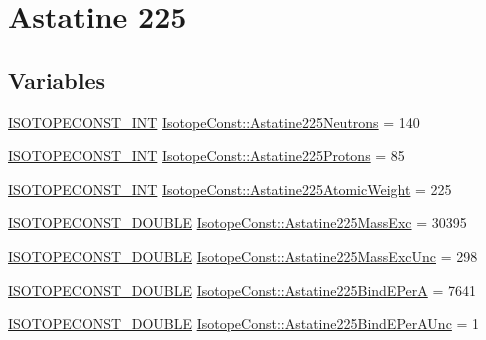 \hypertarget{group___isotope_const-_astatine-_at225}{}\section{Astatine 225}
\label{group___isotope_const-_astatine-_at225}
\subsection*{Variables}
\begin{DoxyCompactItemize}
\item 
\mbox{\hyperlink{group___isotope_const-_macros_ga5f18360b3e99483a35c32d789e62621c}{I\+S\+O\+T\+O\+P\+E\+C\+O\+N\+S\+T\+\_\+\+I\+NT}} \mbox{\hyperlink{group___isotope_const-_astatine-_at225_ga0b307c49f7bea060ae8488622fe5dac0}{Isotope\+Const\+::\+Astatine225\+Neutrons}} = 140
\item 
\mbox{\hyperlink{group___isotope_const-_macros_ga5f18360b3e99483a35c32d789e62621c}{I\+S\+O\+T\+O\+P\+E\+C\+O\+N\+S\+T\+\_\+\+I\+NT}} \mbox{\hyperlink{group___isotope_const-_astatine-_at225_ga6018cf1808e6bab5e8fb52839db77f6d}{Isotope\+Const\+::\+Astatine225\+Protons}} = 85
\item 
\mbox{\hyperlink{group___isotope_const-_macros_ga5f18360b3e99483a35c32d789e62621c}{I\+S\+O\+T\+O\+P\+E\+C\+O\+N\+S\+T\+\_\+\+I\+NT}} \mbox{\hyperlink{group___isotope_const-_astatine-_at225_ga97534ac858da112b8a551ad422049b04}{Isotope\+Const\+::\+Astatine225\+Atomic\+Weight}} = 225
\item 
\mbox{\hyperlink{group___isotope_const-_macros_ga8f45a7272ce02c0b4c65c44636ed719a}{I\+S\+O\+T\+O\+P\+E\+C\+O\+N\+S\+T\+\_\+\+D\+O\+U\+B\+LE}} \mbox{\hyperlink{group___isotope_const-_astatine-_at225_gae29c84bb32ed5de673f866b350b1fed3}{Isotope\+Const\+::\+Astatine225\+Mass\+Exc}} = 30395
\item 
\mbox{\hyperlink{group___isotope_const-_macros_ga8f45a7272ce02c0b4c65c44636ed719a}{I\+S\+O\+T\+O\+P\+E\+C\+O\+N\+S\+T\+\_\+\+D\+O\+U\+B\+LE}} \mbox{\hyperlink{group___isotope_const-_astatine-_at225_gafb95f0cf03dddcce30cd886450c2428f}{Isotope\+Const\+::\+Astatine225\+Mass\+Exc\+Unc}} = 298
\item 
\mbox{\hyperlink{group___isotope_const-_macros_ga8f45a7272ce02c0b4c65c44636ed719a}{I\+S\+O\+T\+O\+P\+E\+C\+O\+N\+S\+T\+\_\+\+D\+O\+U\+B\+LE}} \mbox{\hyperlink{group___isotope_const-_astatine-_at225_ga3806af05a865cbeac3f11f0642c22ea4}{Isotope\+Const\+::\+Astatine225\+Bind\+E\+PerA}} = 7641
\item 
\mbox{\hyperlink{group___isotope_const-_macros_ga8f45a7272ce02c0b4c65c44636ed719a}{I\+S\+O\+T\+O\+P\+E\+C\+O\+N\+S\+T\+\_\+\+D\+O\+U\+B\+LE}} \mbox{\hyperlink{group___isotope_const-_astatine-_at225_gad868aa71c15d85c7148d4e54c28feb9c}{Isotope\+Const\+::\+Astatine225\+Bind\+E\+Per\+A\+Unc}} = 1

\end{DoxyCompactItemize}
